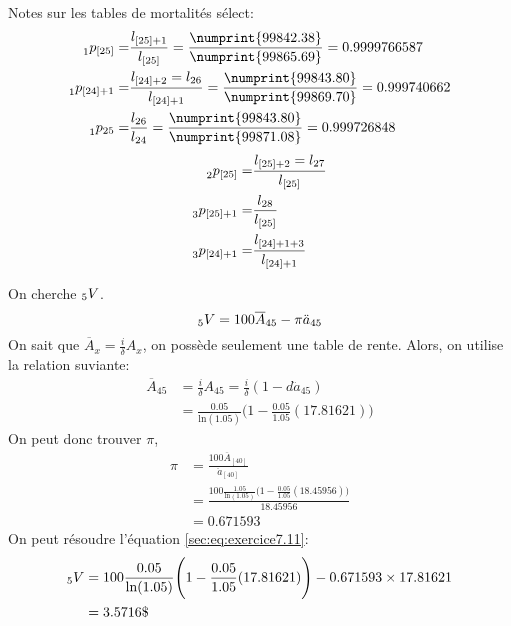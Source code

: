 \documentclass[11pt,french]{report}
\newcommand{\indiceGauche}[2]{{\vphantom{#2}}_{#1}#2}
\begin{document}
Notes sur les tables de mortalités sélect:
\begin{align*}
\indiceGauche{1}{p}_{[25]} =& \frac{l_{[25] + 1}}{l_{[25]}} = \frac{\numprint{99842.38}}{\numprint{99865.69}} = 0.9999766587\\
\indiceGauche{1}{p}_{[24] + 1} =& \frac{l_{[24] +2} = l_{26}}{l_{[24] + 1}} = \frac{\numprint{99843.80}}{\numprint{99869.70}} = 0.999740662\\
\indiceGauche{1}{p}_{25} =& \frac{l_{26}}{l_{24}} = \frac{\numprint{99843.80}}{\numprint{99871.08}} = 0.999726848\\
\end{align*}
\begin{align*}
\indiceGauche{2}{p}_{[25]} =& \frac{l_{[25] + 2} = l_{27}}{l_{[25]}} \\
\indiceGauche{3}{p}_{[25] + 1} =& \frac{l_{28}}{l_{[25]}} \\
\indiceGauche{3}{p}_{[24] + 1} =& \frac{l_{[24]+1+3}}{l_{[24] + 1}} \\
\end{align*}

On cherche $\indiceGauche{5}{V}$.
\begin{equation}
\label{sec:eq:exercice7.11}
\indiceGauche{5}{V} = 100 \overline{A}_{45} - \pi \ddot{a}_{45} 
\end{equation}
On sait que $\overline{A}_x = \frac{i}{\delta}A_x$, on possède seulement une table de rente. Alors, on utilise la relation suviante:
\begin{align*}
\overline{A}_{45} &= \frac{i}{\delta}A_{45} = \frac{i}{\delta}(1 - d\ddot{a}_{45})\\
&= \frac{0.05}{\text{ln}(1.05)}\Bigg( 1 - \frac{0.05}{1.05}(17.81621)\Bigg)
\end{align*}
On peut donc trouver $\pi$,
\begin{align*}
\pi &= \frac{100 \overline{A}_{[40]}}{\ddot{a}_{[40]}} \\
&= \frac{100 \frac{1.05}{\text{ln}(1.05)}\Bigg( 1 - \frac{0.05}{1.05}(18.45956)\Bigg)}{18.45956}\\
&=0.671593
\end{align*}
On peut résoudre l'équation \ref{sec:eq:exercice7.11}:
\begin{align*}
\indiceGauche{5}{V} &= 100 \frac{0.05}{\text{ln}(1.05)}\Bigg( 1 - \frac{0.05}{1.05}(17.81621)\Bigg)  - 0.671593 \times  17.81621 \\
& = 3.5716\$
\end{align*}
\end{document}
